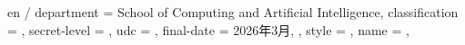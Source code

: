 {{    en / department      = {School of Computing and Artificial Intelligence},
    classification       = {},               %
    secret-level         = {},               %
    udc                  = {},               %
    final-date           = {2026年3月},
  },
  style = {%
  },
  name = {
  },
}

